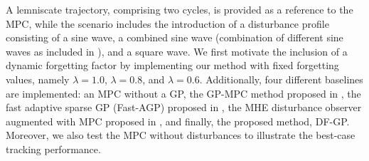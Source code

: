 




  




A lemniscate trajectory, comprising two cycles, is provided as a reference to the \ac{MPC}, while the scenario includes the introduction of a disturbance profile consisting of a sine wave, a combined sine wave (combination of different sine waves as included in \cite{mohit_gp}), and a square wave. 
We first motivate the inclusion of a dynamic forgetting factor by implementing our method with fixed forgetting values, namely $\lambda = 1.0$, $\lambda = 0.8$, and $\lambda = 0.6$. Additionally, four different baselines are implemented: an \ac{MPC} without a \ac{GP}, the \ac{GP}-\ac{MPC} method proposed in \cite{mohit_gp}, the fast adaptive sparse \ac{GP} (Fast-AGP) proposed in \cite{asgp}, the \ac{MHE} disturbance observer augmented with \ac{MPC} proposed in \cite{mpc_mhe}, and finally, the proposed method, \ac{DF-GP}. Moreover, we also test the \ac{MPC} without disturbances to illustrate the best-case tracking performance.














